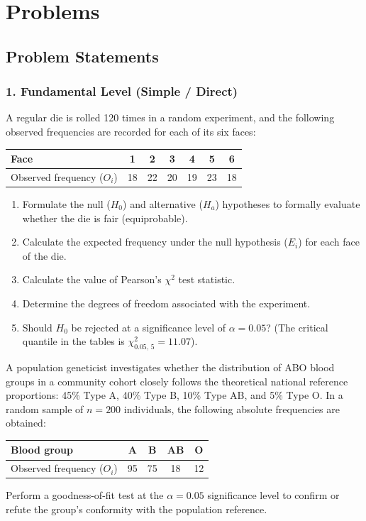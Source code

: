 \section*{Problems}

\subsection{Problem Statements}

\subsubsection*{1. Fundamental Level (Simple / Direct)}

\begin{problema}
	\label{prob:3f1ec07}
	A regular die is rolled 120 times in a random experiment, and the following observed frequencies are recorded for each of its six faces:
	\begin{center}
		\begin{tabular}{|l|c|c|c|c|c|c|}\hline
			Face & 1 & 2 & 3 & 4 & 5 & 6 \\\hline
			Observed frequency ($O_i$) & 18 & 22 & 20 & 19 & 23 & 18 \\\hline
		\end{tabular}
	\end{center}
	\begin{enumerate}
		\item Formulate the null ($H_0$) and alternative ($H_a$) hypotheses to formally evaluate whether the die is fair (equiprobable).
		\item Calculate the expected frequency under the null hypothesis ($E_i$) for each face of the die.
		\item Calculate the value of Pearson's $\chi^2$ test statistic.
		\item Determine the degrees of freedom associated with the experiment.
		\item Should $H_0$ be rejected at a significance level of $\alpha = 0.05$? (The critical quantile in the tables is $\chi^2_{0.05, \, 5} = 11.07$).
	\end{enumerate}
\end{problema}

\begin{problema}
	\label{prob:d4859df}
	A population geneticist investigates whether the distribution of ABO blood groups in a community cohort closely follows the theoretical national reference proportions: 45\% Type A, 40\% Type B, 10\% Type AB, and 5\% Type O. In a random sample of $n = 200$ individuals, the following absolute frequencies are obtained:
	\begin{center}
		\begin{tabular}{|l|c|c|c|c|}\hline
			Blood group & A & B & AB & O \\\hline
			Observed frequency ($O_i$) & 95 & 75 & 18 & 12 \\\hline
		\end{tabular}
	\end{center}
	Perform a goodness-of-fit test at the $\alpha = 0.05$ significance level to confirm or refute the group's conformity with the population reference.
\end{problema}

